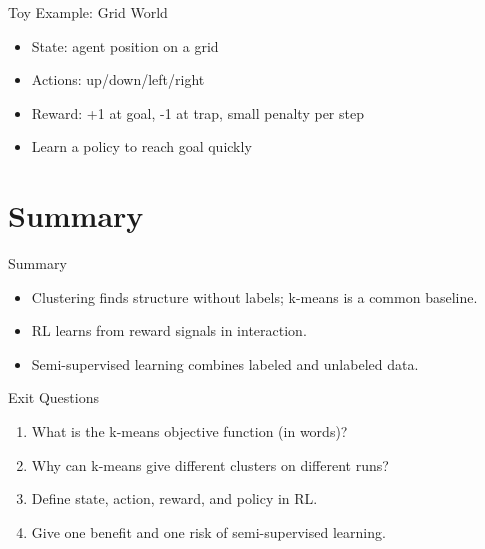 \documentclass[aspectratio=169]{beamer}
\begin{document}
\begin{frame}{Toy Example: Grid World}
  \begin{itemize}[<+->]
    \item State: agent position on a grid
    \item Actions: up/down/left/right
    \item Reward: +1 at goal, -1 at trap, small penalty per step
    \item Learn a policy to reach goal quickly
  \end{itemize}
\end{frame}

\section{Summary}
\label{sec:summary}

\begin{frame}{Summary}
  \begin{itemize}
    \item Clustering finds structure without labels; k-means is a common baseline.
    \item RL learns from reward signals in interaction.
    \item Semi-supervised learning combines labeled and unlabeled data.
  \end{itemize}
  \slidesources{\AIMLUnitIVSources}
\end{frame}

\begin{frame}{Exit Questions}
  \begin{enumerate}
    \item What is the k-means objective function (in words)?
    \item Why can k-means give different clusters on different runs?
    \item Define state, action, reward, and policy in RL.
    \item Give one benefit and one risk of semi-supervised learning.
  \end{enumerate}
\end{frame}
\end{document}
